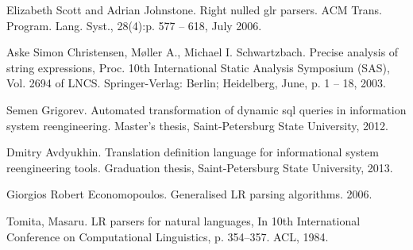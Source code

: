 \documentclass{acm_proc_article-sp}
\begin{document}
\begin{thebibliography}{}
Elizabeth Scott and Adrian Johnstone. Right nulled glr parsers. ACM Trans. Program. Lang. Syst., 28(4):p. 577 -- 618, July 2006.

Aske Simon Christensen, M{\o}ller A., Michael I. Schwartzbach. Precise analysis of string expressions, Proc. 10th International Static Analysis Symposium (SAS), Vol. 2694 of LNCS. Springer-Verlag: Berlin; Heidelberg, June, p. 1 -- 18, 2003.







Semen Grigorev. Automated transformation of dynamic sql queries in information system reengineering. Master's thesis, Saint-Petersburg State University, 2012.

Dmitry Avdyukhin. Translation definition language for informational system reengineering tools. Graduation thesis, Saint-Petersburg State University, 2013.


 Giorgios Robert Economopoulos. Generalised LR parsing algorithms. 2006.
 
 Tomita, Masaru. LR parsers for natural languages, In 10th International Conference on Computational Linguistics, p. 354--357. ACL, 1984.

 

\end{thebibliography}
\end{document}
